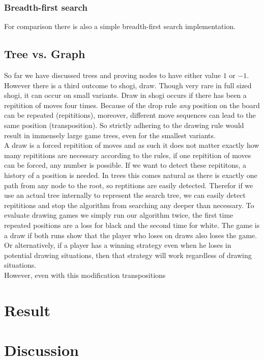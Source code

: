 \documentclass{article}
\begin{document}
\subsubsection*{Breadth-first search}
For comparison there is also a simple breadth-first search implementation.

\subsection{Tree vs. Graph}
So far we have discussed trees and proving nodes to have either value $1$ or $-1$. However there is a third outcome to shogi, draw. Though
very rare in full sized shogi, it can occur on small variants. Draw in shogi occurs if there has been a repitition
of moves four times. Because of the drop rule \textit{any} position on the board can be repeated (repititions), moreover, different move
sequences can lead to the same position (transposition). So strictly adhering to the drawing rule would result in immensely large game trees,
even for the smallest variants.\\
A draw is a forced repitition of moves and as such it does not matter exactly how many repititions are necessary according to the rules,
if one repitition of moves can be forced, any number is possible. If we want to detect these repititons, a history of a position is needed. In trees this
comes natural as there is exactly one path from any node to the root, so reptitions are easily detected. Therefor if we use an actual tree internally
to represent the search tree, we can easily detect repititions and stop the algorithm from searching any deeper than necessary.
To evaluate drawing games we simply run our algorithm twice, the first time repeated positions are a loss for black and the second time for white.
The game is a draw if both runs show that the player who loses on draws also loses the game. Or alternatively, if a player has a winning strategy
even when he loses in potential drawing situations, then that strategy will work regardless of drawing situations.\\

However, even with this modification transpositions %


\section{Result}


\section{Discussion}
\end{document}
